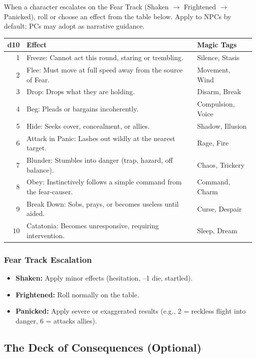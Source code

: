 When a character escalates on the Fear Track (Shaken $\rightarrow$ Frightened $\rightarrow$ Panicked), roll or choose an effect from the table below. Apply to NPCs by default; PCs may adopt as narrative guidance.

\begin{tabular}{@{}rll@{}}
\toprule
\textbf{d10} & \textbf{Effect} & \textbf{Magic Tags} \\
\midrule
1 & Freeze: Cannot act this round, staring or trembling. & Silence, Stasis \\
2 & Flee: Must move at full speed away from the source of Fear. & Movement, Wind \\
3 & Drop: Drops what they are holding. & Disarm, Break \\
4 & Beg: Pleads or bargains incoherently. & Compulsion, Voice \\
5 & Hide: Seeks cover, concealment, or allies. & Shadow, Illusion \\
6 & Attack in Panic: Lashes out wildly at the nearest target. & Rage, Fire \\
7 & Blunder: Stumbles into danger (trap, hazard, off balance). & Chaos, Trickery \\
8 & Obey: Instinctively follows a simple command from the fear-causer. & Command, Charm \\
9 & Break Down: Sobs, prays, or becomes useless until aided. & Curse, Despair \\
10 & Catatonia: Becomes unresponsive, requiring intervention. & Sleep, Dream \\
\bottomrule
\end{tabular}

\subsubsection{Fear Track Escalation}
\begin{itemize}
  \item \textbf{Shaken:} Apply minor effects (hesitation, --1 die, startled).
  \item \textbf{Frightened:} Roll normally on the table.
  \item \textbf{Panicked:} Apply severe or exaggerated results (e.g., 2 = reckless flight into danger, 6 = attacks allies).
\end{itemize}

\subsection{The Deck of Consequences (Optional)}

